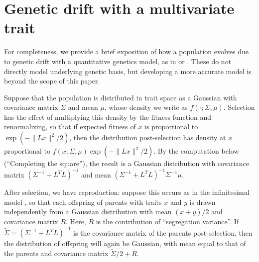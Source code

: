 \documentclass{article}
\newcommand{\1}{\mathbbm{1}}
\begin{document}
\section{Genetic drift with a multivariate trait}
\label{ss:quant_gen}

For completeness, we provide a brief exposition of how a population 
evolves due to genetic drift
with a quantitative genetics model,
as in \citet{lande1981models} or \citet{hansen1996translating}.
These do not directly model underlying genetic basis,
but developing a more accurate model is beyond the scope of this paper.

Suppose that the population is distributed in trait space
as a Gaussian with covariance matrix $\Sigma$ and mean $\mu$,
whose density we write as $f(\cdot;\Sigma,\mu)$.
Selection has the effect of multiplying this density by the fitness function and renormalizing,
so that if expected fitness of $x$ is proportional to $\exp(-\|Lx\|^2/2)$,
then the distribution post-selection
has density at $x$ proportional to $f(x;\Sigma,\mu) \exp(-\|Lx\|^2/2)$.
By the computation below (``Completing the square''),
the result is a Gaussian distribution
with covariance matrix $(\Sigma^{-1} + L^T L)^{-1}$ 
and mean $(\Sigma^{-1}+L^T L)^{-1} \Sigma^{-1} \mu$.

After selection, we have reproduction:
suppose this occurs as in the infinitesimal model \citep{infinitesimal},
so that each offspring of parents with traits $x$ and $y$
is drawn independently from a Gaussian distribution 
with mean $(x+y)/2$ and covariance matrix $R$.
Here, $R$ is the contribution of ``segregation variance''.
If $\widetilde \Sigma = (\Sigma^{-1} + L^T L)^{-1}$ 
is the covariance matrix of the parents post-selection,
then the distribution of offspring will again be Gaussian,
with mean equal to that of the parents
and covariance matrix $\widetilde \Sigma/2 + R$.
\end{document}
